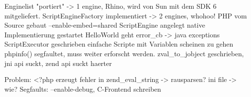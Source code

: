 Enginelist "portiert" -> 1 engine, Rhino, wird von Sun mit dem SDK 6 mitgeliefert.
ScriptEngineFactory implementiert -> 2 engines, whohoo!
PHP vom Source gebaut --enable-embed=shared
ScriptEngine angelegt
native Implementierung gestartet
HelloWorld geht
error\_cb  -> java exceptions
ScriptExecutor geschrieben
einfache Scripte mit Variablen scheinen zu gehen
phpinfo() segfaultet, muss weiter erforscht werden.
zval\_to\_jobject geschrieben, jni api suckt, zend api suckt haerter


Problem: <?php erzeugt fehler in zend\_eval\_string -> rausparsen?
ini file -> wie?
Segfaults: --enable-debug, C-Frontend schreiben





